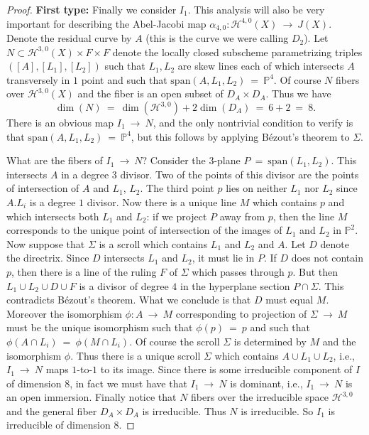 \documentclass[twoside,12pt,reqno]{amsart}
\theoremstyle{plain}
\theoremstyle{definition}
\newcommand{\Hdg}[2]{\mathcal{H}^{#1,#2}}
\newcommand{\PP}{\mathbb{P}}
\def\ps{\vspace{4pt}}
\begin{document}
\begin{proof}
\textbf{First type:}
Finally we consider $I_1$.  This analysis will also be very important
for describing the Abel-Jacobi map
$\alpha_{4,0}:\Hdg{4}{0}(X)~\rightarrow~ J(X)$.  
Denote the residual curve by $A$ (this is the curve we were calling
$D_2$).
Let $N\subset \Hdg{3}{0}(X)\times F\times F$ denote the locally closed subscheme
parametrizing triples $([A],[L_1],[L_2])$ such that $L_1, L_2$ are
skew lines each of which intersects $A$ transversely in $1$ point and
such that $\text{span}(A,L_1,L_2)~=~\PP^4$.
Of course $N$ fibers over $\Hdg{3}{0}(X)$ and the fiber is an open
subset of $D_A\times D_A$.  Thus we have
\begin{equation}
\dim (N)~=~\dim (\Hdg{3}{0})+2\dim (D_A) ~=~ 6+2~=~8.
\end{equation}
There is an obvious map $I_1~\rightarrow~ N$, and the only nontrivial
condition to verify is that $\text{span}(A,L_1,L_2)~=~\PP^4$, but this follows 
by applying B\'ezout's theorem to $\Sigma$.  

\ps

What are the fibers of
$I_1~\rightarrow~ N$?  Consider the $3$-plane $P~=~\text{span}(L_1,L_2)$.
This intersects $A$ in a degree $3$ divisor.  Two of the points of
this divisor are the points of intersection of $A$ and $L_1$, $L_2$.
The third point $p$ lies on neither $L_1$ nor $L_2$ since $A.L_i$ is a
degree $1$ divisor.  Now there is a unique line $M$ which contains $p$ 
and which intersects both $L_1$ and $L_2$: if we project $P$ away from 
$p$, then the line $M$ corresponds to the unique point of intersection 
of the images of $L_1$ and $L_2$ in $\PP^2$.  Now suppose that
$\Sigma$ is a scroll which contains $L_1$ and $L_2$ and $A$.  Let $D$
denote the directrix.  Since $D$ intersects $L_1$ and $L_2$, it must
lie in $P$.  If $D$ does not contain $p$, then there is a line of the
ruling $F$ of $\Sigma$ which passes through $p$.  But then $L_1\cup
L_2\cup D\cup F$ is a divisor of degree $4$ in the hyperplane section
$P\cap \Sigma$.  This contradicts B\'ezout's theorem.  What we
conclude is that $D$ must equal $M$.  Moreover the isomorphism
$\phi:A~\rightarrow~ M$ corresponding to projection of
$\Sigma~\rightarrow~ M$ must be the unique isomorphism such that
$\phi(p)~=~p$ and such that $\phi(A\cap L_i) ~=~ \phi(M\cap L_i)$.  Of
course the scroll $\Sigma$ is determined by $M$ and the isomorphism
$\phi$.  Thus there is a unique scroll $\Sigma$ which contains $A\cup
L_1\cup L_2$, i.e., $I_1~\rightarrow~ N$ maps $1$-to-$1$ to its image.
Since there is some irreducible component of $I$ of dimension $8$, in
fact we must have that $I_1~\rightarrow~ N$ is dominant,
i.e., $I_1~\rightarrow~ N$ is an open immersion.  Finally notice that $N$ 
fibers over the irreducible space $\Hdg{3}{0}$ and the general fiber
$D_A\times D_A$ is irreducible.  Thus $N$ is irreducible.  So $I_1$ is 
irreducible of dimension $8$.


\end{proof}
\end{document}
